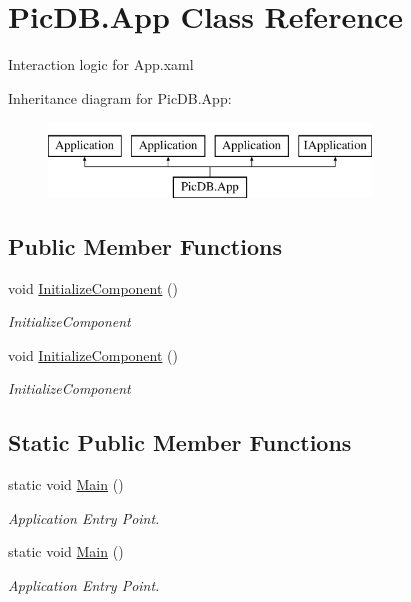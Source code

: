 \hypertarget{class_pic_d_b_1_1_app}{}\section{Pic\+D\+B.\+App Class Reference}
\label{class_pic_d_b_1_1_app}


Interaction logic for App.\+xaml  


Inheritance diagram for Pic\+D\+B.\+App\+:\begin{figure}[H]
\begin{center}
\leavevmode
\includegraphics[height=2.000000cm]{class_pic_d_b_1_1_app}
\end{center}
\end{figure}
\subsection*{Public Member Functions}
\begin{DoxyCompactItemize}
\item 
void \mbox{\hyperlink{class_pic_d_b_1_1_app_a5054dc6504ce586ec38da4e192b9616d}{Initialize\+Component}} ()
\begin{DoxyCompactList}\small\item\em Initialize\+Component \end{DoxyCompactList}\item 
void \mbox{\hyperlink{class_pic_d_b_1_1_app_a5054dc6504ce586ec38da4e192b9616d}{Initialize\+Component}} ()
\begin{DoxyCompactList}\small\item\em Initialize\+Component \end{DoxyCompactList}\end{DoxyCompactItemize}
\subsection*{Static Public Member Functions}
\begin{DoxyCompactItemize}
\item 
static void \mbox{\hyperlink{class_pic_d_b_1_1_app_ab2af6a7ddcf2878c6e054101dffa3aee}{Main}} ()
\begin{DoxyCompactList}\small\item\em Application Entry Point. \end{DoxyCompactList}\item 
static void \mbox{\hyperlink{class_pic_d_b_1_1_app_ab2af6a7ddcf2878c6e054101dffa3aee}{Main}} ()
\begin{DoxyCompactList}\small\item\em Application Entry Point. \end{DoxyCompactList}\end{DoxyCompactItemize}


